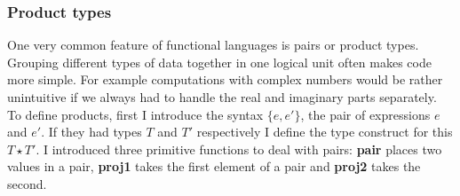 \documentclass[12pt,twoside,notitlepage]{report}
\theoremstyle{plain}%
\theoremstyle{definition}
\theoremstyle{remark}
\begin{document}
\subsubsection{Product types}
One very common feature of functional languages is pairs or product types. Grouping different types of data together in one logical unit often makes code more simple. For example computations with complex numbers would be rather unintuitive if we always had to handle the real and imaginary parts separately. To define products, first I introduce the syntax $ \{e, e' \} $, the pair of expressions $ e $ and $ e' $. If they had types $ T $ and $ T' $ respectively I define the type construct for this $ T\star T' $. I introduced three primitive functions to deal with pairs: \textbf{pair} places two values in a pair, \textbf{proj1} takes the first element of a pair and \textbf{proj2} takes the second.
\end{document}
